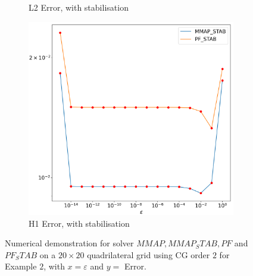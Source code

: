 \documentclass[12pt]{ociamthesis}
\begin{document}
\begin{figure}[H]
\begin{subfigure}{0.44\textwidth}
     \caption{L2 Error, with stabilisation}
 \end{subfigure}
 \hfill
 \begin{subfigure}{0.44\textwidth}
     \includegraphics[width=\textwidth]{Pics/LHSims/E2/E2_STABH1.png}
     \caption{H1 Error, with stabilisation}
 \end{subfigure}
 \caption{Numerical demonstration for solver $MMAP, MMAP_STAB, PF$ and $PF_STAB$ on a $20\times 20$ quadrilateral grid using CG order $2$ for Example $2$, with $x=\varepsilon$ and $y=$ Error.} \label{E2_LH}
\end{figure}
\end{document}
